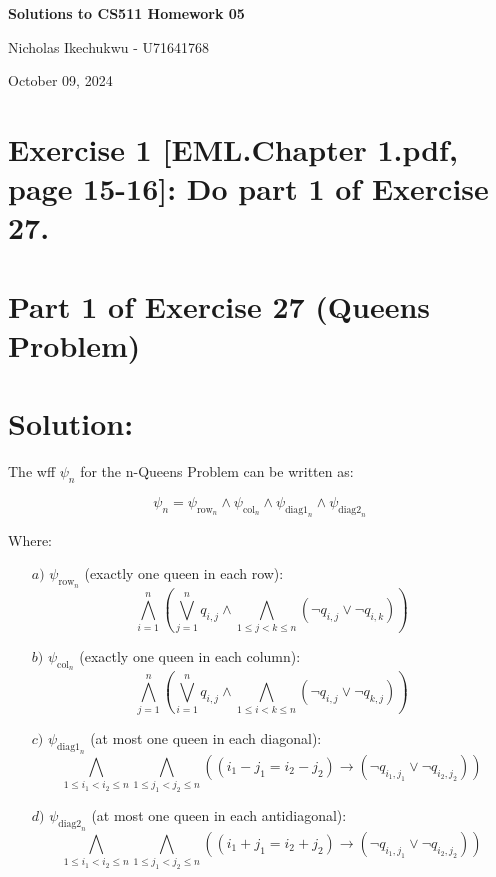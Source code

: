 \documentclass{article}
\begin{document}
\begin{center}
    \Large\textbf{Solutions to CS511 Homework 05}
    
    \vspace{0.5cm}
    
    \large Nicholas Ikechukwu - U71641768
    
    \vspace{0.3cm}
    
    \large October 09, 2024
\end{center}



\section*{Exercise 1 [EML.Chapter 1.pdf, page 15-16]: Do part 1 of Exercise 27.}

\section*{Part 1 of Exercise 27 (Queens Problem)}
\section*{Solution:}

The wff $\psi_n$ for the n-Queens Problem can be written as:

\[ \psi_n = \psi_{\text{row}_n} \wedge \psi_{\text{col}_n} \wedge \psi_{\text{diag1}_n} \wedge \psi_{\text{diag2}_n} \]

Where:

\begin{enumerate}
    \item[$a)$] $\psi_{\text{row}_n}$ (exactly one queen in each row):
    \[ \bigwedge_{i=1}^n \left(\bigvee_{j=1}^n q_{i,j} \wedge \bigwedge_{1 \leq j < k \leq n} (\neg q_{i,j} \vee \neg q_{i,k})\right) \]

    \item[$b)$] $\psi_{\text{col}_n}$ (exactly one queen in each column):
    \[ \bigwedge_{j=1}^n \left(\bigvee_{i=1}^n q_{i,j} \wedge \bigwedge_{1 \leq i < k \leq n} (\neg q_{i,j} \vee \neg q_{k,j})\right) \]

    \item[$c)$] $\psi_{\text{diag1}_n}$ (at most one queen in each diagonal):
    \[ \bigwedge_{1 \leq i_1 < i_2 \leq n} \bigwedge_{1 \leq j_1 < j_2 \leq n} ((i_1 - j_1 = i_2 - j_2) \rightarrow (\neg q_{i_1,j_1} \vee \neg q_{i_2,j_2})) \]

    \item[$d)$] $\psi_{\text{diag2}_n}$ (at most one queen in each antidiagonal):
    \[ \bigwedge_{1 \leq i_1 < i_2 \leq n} \bigwedge_{1 \leq j_1 < j_2 \leq n} ((i_1 + j_1 = i_2 + j_2) \rightarrow (\neg q_{i_1,j_1} \vee \neg q_{i_2,j_2})) \]
\end{enumerate}
\end{document}
